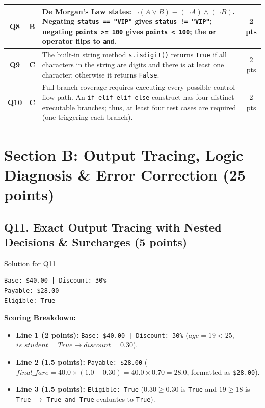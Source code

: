 \documentclass[11pt,a4paper]{article}
\begin{document}
\begin{center}
\begin{tabularx}{\textwidth}{|c|c|X|c|}
\hline
\textbf{Q8} & \textbf{B} & De Morgan's Law states: $\neg(A \lor B) \equiv (\neg A) \land (\neg B)$. Negating \texttt{status == "VIP"} gives \texttt{status != "VIP"}; negating \texttt{points >= 100} gives \texttt{points < 100}; the \texttt{or} operator flips to \texttt{and}. & 2 pts \\
\hline
\textbf{Q9} & \textbf{C} & The built-in string method \texttt{s.isdigit()} returns \texttt{True} if all characters in the string are digits and there is at least one character; otherwise it returns \texttt{False}. & 2 pts \\
\hline
\textbf{Q10} & \textbf{C} & Full branch coverage requires executing every possible control flow path. An \texttt{if-elif-elif-else} construct has four distinct executable branches; thus, at least four test cases are required (one triggering each branch). & 2 pts \\
\hline
\end{tabularx}
\end{center}

\vspace{0.2cm}

\section*{Section B: Output Tracing, Logic Diagnosis \& Error Correction (25 points)}

\subsection*{Q11. Exact Output Tracing with Nested Decisions \& Surcharges (5 points)}
\begin{solbox}{Solution for Q11}
\begin{lstlisting}
Base: $40.00 | Discount: 30%
Payable: $28.00
Eligible: True
\end{lstlisting}
\textbf{Scoring Breakdown:}
\begin{itemize}[leftmargin=2em]
  \item \textbf{Line 1 (2 points):} \texttt{Base: \$40.00 | Discount: 30\%} ($age = 19 < 25$, $is\_student = True \rightarrow discount = 0.30$).
  \item \textbf{Line 2 (1.5 points):} \texttt{Payable: \$28.00} ($final\_fare = 40.0 \times (1.0 - 0.30) = 40.0 \times 0.70 = 28.0$, formatted as \texttt{\$28.00}).
  \item \textbf{Line 3 (1.5 points):} \texttt{Eligible: True} ($0.30 \ge 0.30$ is \texttt{True} and $19 \ge 18$ is \texttt{True} $\rightarrow$ \texttt{True and True} evaluates to \texttt{True}).
\end{itemize}
\end{solbox}
\end{document}
